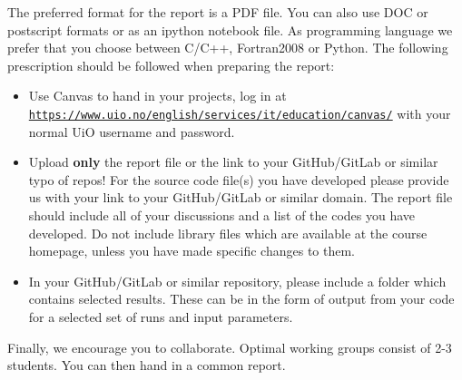 \documentclass[%
oneside,                 %
final,                   %
10pt]{article}
\begin{document}
The preferred format for the report is a PDF file. You can also use DOC or postscript formats or as an ipython notebook file.  As programming language we prefer that you choose between C/C++, Fortran2008 or Python. The following prescription should be followed when preparing the report:

\begin{itemize}
  \item Use Canvas to hand in your projects, log in  at  \href{{https://www.uio.no/english/services/it/education/canvas/}}{\nolinkurl{https://www.uio.no/english/services/it/education/canvas/}} with your normal UiO username and password.

  \item Upload \textbf{only} the report file or the link to your GitHub/GitLab or similar typo of  repos!  For the source code file(s) you have developed please provide us with your link to your GitHub/GitLab or similar  domain.  The report file should include all of your discussions and a list of the codes you have developed.  Do not include library files which are available at the course homepage, unless you have made specific changes to them.

  \item In your GitHub/GitLab or similar repository, please include a folder which contains selected results. These can be in the form of output from your code for a selected set of runs and input parameters.
\end{itemize}

\noindent
Finally, 
we encourage you to collaborate. Optimal working groups consist of 
2-3 students. You can then hand in a common report. 



\end{document}
